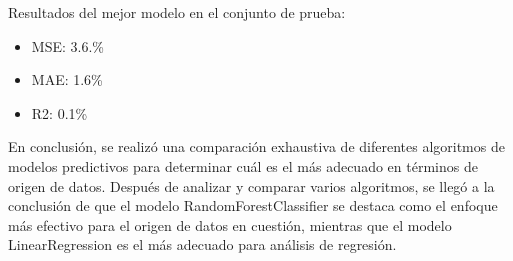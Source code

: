 Resultados del mejor modelo en el conjunto de prueba:

\begin{itemize}
    \item MSE: 3.6.\%
    \item MAE: 1.6\%
    \item R2: 0.1\%
\end{itemize}

En conclusión, se realizó una comparación exhaustiva de diferentes algoritmos de modelos predictivos para determinar cuál es el más adecuado en términos de origen de datos. Después de analizar y comparar varios algoritmos, se llegó a la conclusión de que el modelo RandomForestClassifier se destaca como el enfoque más efectivo para el origen de datos en cuestión, mientras que el modelo LinearRegression es el más adecuado para análisis de regresión.